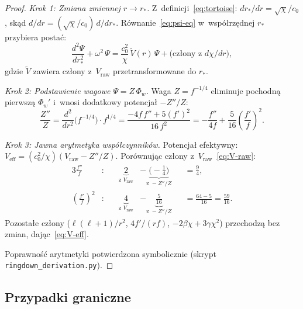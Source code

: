 \begin{proof}
\emph{Krok 1: Zmiana zmiennej $r \to r_*$.}
Z~definicji~\eqref{eq:tortoise}: $dr_*/dr = \sqrt{\chi}/c_0$,
sk\k{a}d $d/dr = (\sqrt{\chi}/c_0)\,d/dr_*$.
R\'ownanie~\eqref{eq:psi-eq} w~wsp\'o\l{}rz\k{e}dnej $r_*$
przybiera posta\'c:
\begin{equation}\label{eq:psi-tortoise}
  \frac{d^2\Psi}{dr_*^2}
  + \omega^2\,\Psi
  = \frac{c_0^2}{\chi}\,\widetilde{V}(r)\,\Psi
  + \text{(cz\l{}ony z~$d\chi/dr$)},
\end{equation}
gdzie $\widetilde{V}$ zawiera cz\l{}ony z~$V_{\mathrm{raw}}$
przetransformowane do $r_*$.

\emph{Krok 2: Podstawienie wagowe $\Psi = Z\,\Phi_w$.}
Waga $Z = f^{-1/4}$ eliminuje pochodn\k{a} pierwsz\k{a}
$\Phi_w'$ i~wnosi dodatkowy potencja\l{} $-Z''/Z$:
\begin{equation}
  \frac{Z''}{Z} = \frac{d^2}{dr^2}\bigl(f^{-1/4}\bigr)
  \cdot f^{1/4}
  = \frac{-4f\,f'' + 5(f')^2}{16\,f^2}
  = -\frac{f''}{4f} + \frac{5}{16}\left(\frac{f'}{f}\right)^{\!2}.
\end{equation}

\emph{Krok 3: Jawna arytmetyka wsp\'o\l{}czynnik\'ow.}
Potencja\l{} efektywny: $V_{\mathrm{eff}} = (c_0^2/\chi)
(V_{\mathrm{raw}} - Z''/Z)$. Porównuj\k{a}c cz\l{}ony
z~$V_{\mathrm{raw}}$~\eqref{eq:V-raw}:
\begin{alignat}{3}
  \frac{f''}{f}&:\quad &
    \underbrace{2}_{\text{z }V_{\mathrm{raw}}}
    &- \underbrace{\bigl(-\tfrac{1}{4}\bigr)}_{\text{z }-Z''/Z}
    &&= \frac{9}{4}, \label{eq:coeff-9-4}\\[4pt]
  \left(\frac{f'}{f}\right)^{\!2}&:\quad &
    \underbrace{4}_{\text{z }V_{\mathrm{raw}}}
    &- \underbrace{\tfrac{5}{16}}_{\text{z }-Z''/Z}
    &&= \frac{64-5}{16} = \frac{59}{16}. \label{eq:coeff-59-16}
\end{alignat}
Pozosta\l{}e cz\l{}ony ($\ell(\ell+1)/r^2$, $4f'/(rf)$,
$-2\beta\chi + 3\gamma\chi^2$) przechodz\k{a} bez zmian,
daj\k{a}c~\eqref{eq:V-eff}.

Poprawno\'s\'c arytmetyki potwierdzona symbolicznie
(skrypt \texttt{ringdown\_derivation.py}).
\end{proof}

\subsection{Przypadki graniczne}


